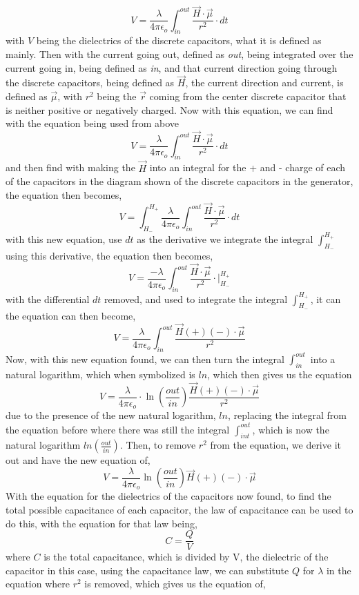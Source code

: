 \documentclass[]{article}
\begin{document}
\[V = \frac{\lambda}{4\pi\epsilon_o} \int_{in}^{out} \frac{\vec{H}\cdot \vec{\mu}}{r^2} \cdot dt\]
with $V$ being the dielectrics of the discrete capacitors, what it is defined as mainly. Then with the current going out, defined as \textit{out}, being integrated over the current going in, being defined as \textit{in}, and that current direction going through the discrete capacitors, being defined as $\vec{H}$, the current direction and current, is defined as $\vec{\mu}$, with $r^2$ being the $\vec{r}$ coming from the center discrete capacitor that is neither positive or negatively charged. Now with this equation, we can find with the equation being used from above 
\[V =\frac{\lambda}{4\pi\epsilon_o}\int_{in}^{out} \frac{\vec{H}\cdot \vec{\mu}}{r^2} \cdot dt\]
and then find with making the $\vec{H}$ into an integral for the + and - charge of each of the capacitors in the diagram shown of the discrete capacitors in the generator, the equation then becomes,
\[V = \int_{H_-}^{H_+} \frac{\lambda}{4\pi\epsilon_o}\int_{in}^{out}\frac{\vec{H} \cdot \vec{\mu}}{r^2} \cdot dt\]
with this new equation, use $dt$ as the derivative we integrate the integral $\int_{H_-}^{H_+}$ using this derivative, the equation then becomes,
\[V = \frac{-\lambda}{4\pi\epsilon_o} \int_{in}^{out}\frac{\vec{H} \cdot \vec{\mu}}{r^2} \cdot \biggr|_{H_{-}}^{H_{+}}\]
with the differential $dt$ removed, and used to integrate the integral $\int_{H_-}^{H_+}$, it can the equation can then become,
\[V = \frac{\lambda}{4\pi\epsilon_o}\int_{in}^{out} \frac{\vec{H}(+)(-) \cdot \vec{\mu}}{r^2}\]
Now, with this new equation found, we can then turn the integral $\int_{in}^{out}$ into a natural logarithm, which when symbolized is $ln$, which then gives us the equation
\[V = \frac{\lambda}{4\pi\epsilon_o} \cdot \ln(\frac{out}{in})\frac{\vec{H}(+)(-) \cdot \vec{\mu}}{r^2}\]
due to the presence of the new natural logarithm, $ln$, replacing the integral from the equation before where there was still the integral $\int_{int}^{out}$, which is now the natural logarithm $ln(\frac{out}{in})$. Then, to remove $r^2$ from the equation, we derive it out and have the new equation of, 
\[V = \frac{\lambda}{4\pi\epsilon_o} \ln(\frac{out}{in})\vec{H}(+)(-)\cdot \vec{\mu}\]
With the equation for the dielectrics of the capacitors now found, to find the total possible capacitance of each capacitor, the law of capacitance can be used to do this, with the equation for that law being,
\[C = \frac{Q}{V} \]
where $C$ is the total capacitance, which is divided by V, the dielectric of the capacitor in this case, using the capacitance law, we can substitute $Q$ for $\lambda$ in the equation  where $r^2$ is removed, which gives us the equation of,
\end{document}
